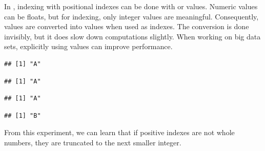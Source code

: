 \documentclass[krantz2]{krantz}\usepackage{knitr}
\begin{document}
\begin{explainbox}\label{box:vec:sort}
In \Rlang, indexing with positional indexes can be done with  or  values. Numeric values can be floats, but for indexing, only integer values are meaningful. Consequently,  values are converted into  values when used as indexes. The conversion is done invisibly, but it does slow down computations slightly. When working on big data sets, explicitly using  values can improve performance.

\begin{knitrout}\footnotesize
{}\color{fgcolor}\begin{kframe}
\begin{alltt}
 \hlkwb{<-} \hlstd{LETTERS[}\hlopt{:}\hlstd{]}
\hlstd{b[}\hlstd{]}
\end{alltt}
\begin{verbatim}
## [1] "A"
\end{verbatim}
\begin{alltt}
\hlstd{b[}\hlstd{]}
\end{alltt}
\begin{verbatim}
## [1] "A"
\end{verbatim}
\begin{alltt}
\hlstd{b[}\hlstd{]} 
\end{alltt}
\begin{verbatim}
## [1] "A"
\end{verbatim}
\begin{alltt}
\hlstd{b[}\hlstd{]}
\end{alltt}
\begin{verbatim}
## [1] "B"
\end{verbatim}
\end{kframe}
\end{knitrout}

From this experiment, we can learn that if positive indexes are not whole numbers, they are truncated to the next smaller integer.


\end{explainbox}
\end{document}
